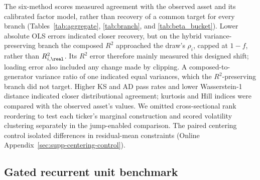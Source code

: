 The six-method scores measured agreement with the observed asset and
its calibrated factor model, rather than recovery of a common target
for every branch (Tables~\ref{tab:aggregate}, \ref{tab:branch}, and
\ref{tab:beta_bucket}). Lower absolute OLS errors indicated closer
recovery, but on the hybrid variance-preserving branch the composed
$R^2$ approached the draw's $\rho_i$, capped at $1-f$, rather than
$R^2_{i,\real}$. Its $R^2$ error therefore mainly measured this
designed shift; loading error also included any change made by
clipping. A composed-to-generator variance ratio of one indicated
equal variances, which the $R^2$-preserving branch did not target.
Higher KS and AD pass rates and lower Wasserstein-1 distance indicated
closer distributional agreement; kurtosis and Hill indices were
compared with the observed asset's values. We omitted cross-sectional
rank reordering to test each ticker's marginal construction and
scored volatility clustering separately in the jump-enabled comparison.
The paired centering control isolated differences in residual-mean
constraints (Online Appendix~\ref{sec:supp-centering-control}).


\subsection{Gated recurrent unit benchmark}
\label{sec:supp-gru}

